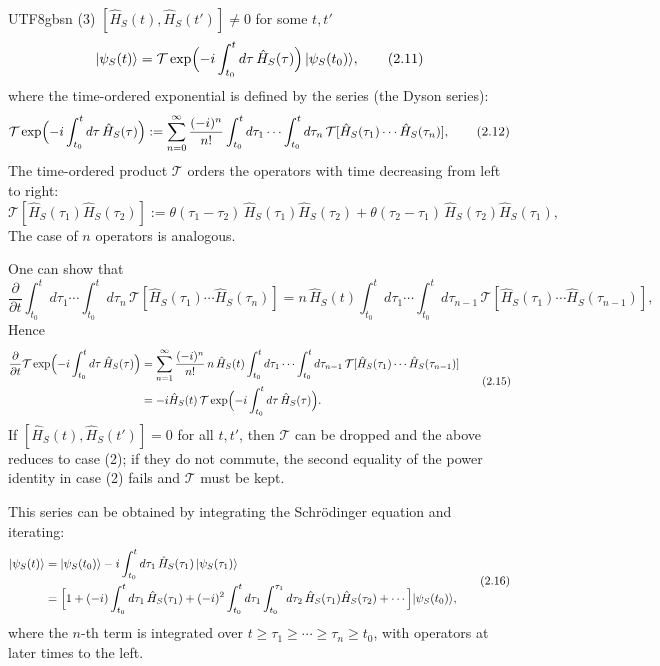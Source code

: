 \documentclass[11pt,a4paper,oneside]{report}
\begin{document}
\begin{CJK*}{UTF8}{gbsn}
(3) $[\hat H_S(t),\hat H_S(t')]\neq0$ for some $t,t'$
\begin{equation*}
|\psi_S(t)\rangle=\mathcal T\exp\Bigl(-i\int_{t_0}^{t}d\tau\,\hat H_S(\tau)\Bigr)\,|\psi_S(t_0)\rangle ,
\tag{2.11}\label{eq:2.11}
\end{equation*}
where the time-ordered exponential is defined by the series (the Dyson series):
\begin{equation*}
\mathcal T\exp\Bigl(-i\int_{t_0}^{t}d\tau\,\hat H_S(\tau)\Bigr)
:=\sum_{n=0}^{\infty}\frac{(-i)^n}{n!}\int_{t_0}^{t}d\tau_1\cdots\int_{t_0}^{t}d\tau_n\,
\mathcal T[\hat H_S(\tau_1)\cdots\hat H_S(\tau_n)],
\tag{2.12}\label{eq:2.12}
\end{equation*}
The time-ordered product $\mathcal T$ orders the operators with time decreasing from left to right:
\begin{equation*}
\mathcal T[\hat H_S(\tau_1)\hat H_S(\tau_2)]
:=\theta(\tau_1-\tau_2)\,\hat H_S(\tau_1)\hat H_S(\tau_2)+\theta(\tau_2-\tau_1)\,\hat H_S(\tau_2)\hat H_S(\tau_1),
\tag{2.13}\label{eq:2.13}
\end{equation*}
The case of $n$ operators is analogous.

One can show that
\begin{equation*}
\frac{\partial}{\partial t}\int_{t_0}^{t}d\tau_1\cdots\int_{t_0}^{t}d\tau_n\,
\mathcal T[\hat H_S(\tau_1)\cdots\hat H_S(\tau_n)]
=n\,\hat H_S(t)\int_{t_0}^{t}d\tau_1\cdots\int_{t_0}^{t}d\tau_{n-1}\,
\mathcal T[\hat H_S(\tau_1)\cdots\hat H_S(\tau_{n-1})],
\tag{2.14}\label{eq:2.14}
\end{equation*}
Hence
\begin{equation*}
\begin{aligned}
\frac{\partial}{\partial t}\mathcal T\exp\Bigl(-i\int_{t_0}^{t}d\tau\,\hat H_S(\tau)\Bigr)
&=\sum_{n=1}^{\infty}\frac{(-i)^n}{n!}\,n\,\hat H_S(t)\int_{t_0}^{t}d\tau_1\cdots\int_{t_0}^{t}d\tau_{n-1}\,
\mathcal T[\hat H_S(\tau_1)\cdots\hat H_S(\tau_{n-1})]\\
&=-i\hat H_S(t)\,\mathcal T\exp\Bigl(-i\int_{t_0}^{t}d\tau\,\hat H_S(\tau)\Bigr).
\end{aligned}
\tag{2.15}\label{eq:2.15}
\end{equation*}
If $[\hat H_S(t),\hat H_S(t')]=0$ for all $t,t'$, then $\mathcal T$ can be dropped and the above reduces to case (2); if they do not commute, the second equality of the power identity in case (2) fails and $\mathcal T$ must be kept.

This series can be obtained by integrating the Schrödinger equation and iterating:
\begin{equation*}
\begin{aligned}
|\psi_S(t)\rangle
&=|\psi_S(t_0)\rangle-i\int_{t_0}^{t}d\tau_1\,\hat H_S(\tau_1)\,|\psi_S(\tau_1)\rangle\\
&=\Bigl[1+(-i)\int_{t_0}^{t}d\tau_1\,\hat H_S(\tau_1)
+(-i)^2\int_{t_0}^{t}d\tau_1\int_{t_0}^{\tau_1}d\tau_2\,\hat H_S(\tau_1)\hat H_S(\tau_2)+\cdots\Bigr]|\psi_S(t_0)\rangle ,
\end{aligned}
\tag{2.16}\label{eq:2.16}
\end{equation*}
where the $n$-th term is integrated over $t\ge\tau_1\ge\cdots\ge\tau_n\ge t_0$, with operators at later times to the left.


\end{CJK*}
\end{document}
